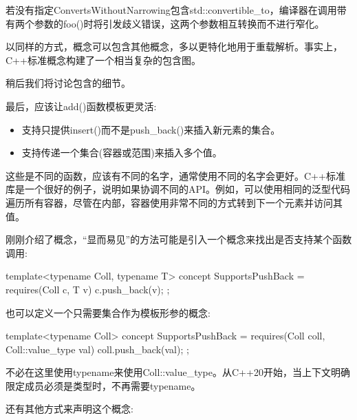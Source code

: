 若没有指定ConvertsWithoutNarrowing包含std::convertible\_to，编译器在调用带有两个参数的foo()时将引发歧义错误，这两个参数相互转换而不进行窄化。

以同样的方式，概念可以包含其他概念，多以更特化地用于重载解析。事实上，C++标准概念构建了一个相当复杂的包含图。

稍后我们将讨论包含的细节。


最后，应该让add()函数模板更灵活:

\begin{itemize}
\item
支持只提供insert()而不是push\_back()来插入新元素的集合。

\item
支持传递一个集合(容器或范围)来插入多个值。
\end{itemize}

这些是不同的函数，应该有不同的名字，通常使用不同的名字会更好。C++标准库是一个很好的例子，说明如果协调不同的API。例如，可以使用相同的泛型代码遍历所有容器，尽管在内部，容器使用非常不同的方式转到下一个元素并访问其值。


刚刚介绍了概念，“显而易见”的方法可能是引入一个概念来找出是否支持某个函数调用:

\begin{cpp}
template<typename Coll, typename T>
concept SupportsPushBack = requires(Coll c, T v) {
	c.push_back(v);
};
\end{cpp}

也可以定义一个只需要集合作为模板形参的概念:

\begin{cpp}
template<typename Coll>
concept SupportsPushBack = requires(Coll coll, Coll::value_type val) {
	coll.push_back(val);
};
\end{cpp}

不必在这里使用typename来使用Coll::value\_type。从C++20开始，当上下文明确限定成员必须是类型时，不再需要typename。

还有其他方式来声明这个概念:


